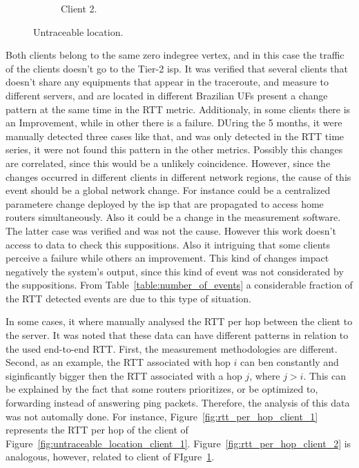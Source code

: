 \begin{figure}[H]
{\begin{subfigure}[b]{0.5\textwidth}
            \caption{Client 2.}\label{fig:untraceable_location_client_2}
        \end{subfigure}%
    }
    \caption{Untraceable location.}
\label{fig:untraceable_location}
\end{figure}%

Both clients belong to the same zero indegree vertex,
and in this case the traffic of the clients doesn't go to the Tier-2 \gls*{isp}.
It was verified that several clients that doesn't share any equipments that
appear in the traceroute, and measure to different servers, and are located in
different Brazilian UFs present a change pattern at the same time in the RTT
metric. Additionaly, in some clients there is an Improvement, while in other
there is a failure. DUring the 5 months, it were manually detected three cases
like that, and was only detected in the RTT time series, it were not found this
pattern in the other metrics. Possibly this changes are correlated, since
this would be a unlikely coincidence. However, since the changes occurred in
different clients in different network regions, the cause of this event should
be a global network change. For instance could be a centralized parametere
change deployed by the \gls*{isp} that are propagated to access home routers
simultaneously. Also it could be a change in the measurement software. The
latter case was verified and was not the cause. However this work doesn't
access to data to check this suppositions. Also it intriguing that some clients
perceive a failure while others an improvement. This kind of changes impact
negatively the system's output, since this kind of event was not considerated
by the suppositions. From Table~\ref{table:number_of_events} a considerable
fraction of the RTT detected events are due to this type of situation.

In some cases, it where manually analysed the RTT per hop between the client to
the server. It was noted that these data can have different patterns in
relation to the used end-to-end RTT. First, the measurement methodologies are
different. Second, as an example, the RTT associated with hop $i$ can ben
constantly and siginficantly bigger then the RTT associated with a hop $j$,
where $j > i$. This can be explained by the fact that some routers prioritizes,
or be optimized to,
forwarding instead of answering ping packets. Therefore, the analysis of this
data was not automally done. For instance, Figure~\ref{fig:rtt_per_hop_client_1}
represents the RTT per hop of the client of
Figure~\ref{fig:untraceable_location_client_1}.
Figure~\ref{fig:rtt_per_hop_client_2} is analogous, however, related to client
of FIgure~\ref{fig:untraceable_location_client_2}.

